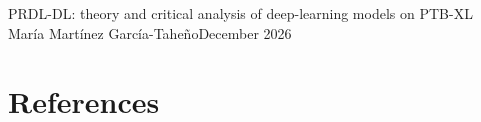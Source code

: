 \documentclass[11pt]{article}
\begin{document}
%
            {PRDL-DL: theory and critical analysis of deep-learning models on PTB-XL}%
            {Mar\'ia Mart\'inez Garc\'ia-Tahe\~no}{December 2026}

\tableofcontents
\newpage


\newpage









\clearpage
\section{References}
\begingroup
\renewcommand{\section}[2]{}


\endgroup

\newpage

\newpage

\end{document}
